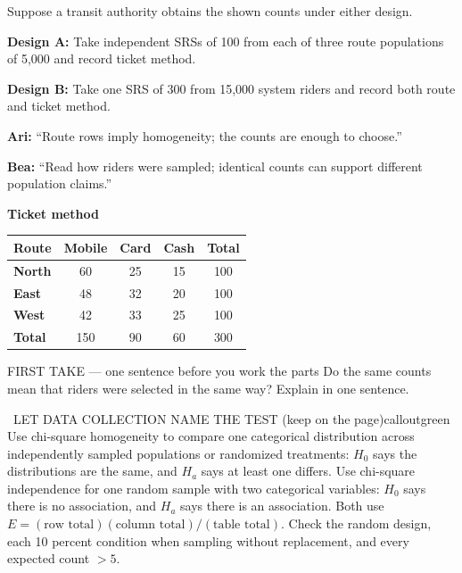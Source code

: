 \documentclass[11pt]{article}
\begin{document}


Suppose a transit authority obtains the shown counts under either design.\par\smallskip \textbf{Design A:} Take independent SRSs of 100 from each of three route populations of 5,000 and record ticket method.\par \textbf{Design B:} Take one SRS of 300 from 15,000 system riders and record both route and ticket method.\par\smallskip \textbf{Ari:} ``Route rows imply homogeneity; the counts are enough to choose.''\par \textbf{Bea:} ``Read how riders were sampled; identical counts can support different population claims.''\par
\begin{center}
\textbf{Ticket method}\par\smallskip
\begin{tabular}{|l|c|c|c|c|}
\hline
\textbf{Route} & \textbf{Mobile} & \textbf{Card} & \textbf{Cash} & \textbf{Total} \\ \hline
\textbf{North} & 60 & 25 & 15 & 100 \\ \hline
\textbf{East} & 48 & 32 & 20 & 100 \\ \hline
\textbf{West} & 42 & 33 & 25 & 100 \\ \hline
\textbf{Total} & 150 & 90 & 60 & 300 \\ \hline
\end{tabular}
\end{center}
\begin{firsttakebox}{FIRST TAKE --- one sentence before you work the parts}
Do the same counts mean that riders were selected in the same way? Explain in one sentence.
\workspace{0.9in}
\end{firsttakebox}

\begin{callout}{\IconBook\ LET DATA COLLECTION NAME THE TEST (keep on the page)}{calloutgreen}
Use chi-square homogeneity to compare one categorical distribution across independently sampled
populations or randomized treatments: $H_0$ says the distributions are the same, and $H_a$ says at least one differs.
Use chi-square independence for one random sample with two categorical variables: $H_0$ says there is no association,
and $H_a$ says there is an association. Both use
$E=(\text{row total})(\text{column total})/(\text{table total})$.
Check the random design, each 10 percent condition when sampling without replacement, and every expected count $>5$.
\end{callout}
\end{document}
